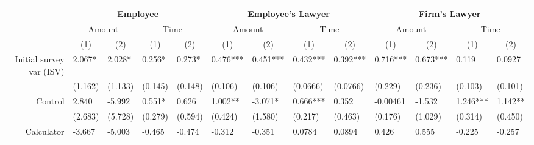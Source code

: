 \begin{tabular}{rrrrrrrrrrrrr}
\toprule
      & \multicolumn{4}{c}{Employee}  & \multicolumn{4}{c}{Employee's Lawyer} & \multicolumn{4}{c}{Firm's Lawyer} \\
\midrule
      & \multicolumn{2}{c}{Amount} & \multicolumn{2}{c}{Time} & \multicolumn{2}{c}{Amount} & \multicolumn{2}{c}{Time} & \multicolumn{2}{c}{Amount} & \multicolumn{2}{c}{Time} \\
      & \multicolumn{1}{c}{(1)} & \multicolumn{1}{c}{(2)} & \multicolumn{1}{c}{(1)} & \multicolumn{1}{c}{(2)} & \multicolumn{1}{c}{(1)} & \multicolumn{1}{c}{(2)} & \multicolumn{1}{c}{(1)} & \multicolumn{1}{c}{(2)} & \multicolumn{1}{c}{(1)} & \multicolumn{1}{c}{(2)} & \multicolumn{1}{c}{(1)} & \multicolumn{1}{c}{(2)} \\
Initial survey var (ISV) & \multicolumn{1}{l}{2.067*} & \multicolumn{1}{l}{2.028*} & \multicolumn{1}{l}{0.256*} & \multicolumn{1}{l}{0.273*} & \multicolumn{1}{l}{0.476***} & \multicolumn{1}{l}{0.451***} & \multicolumn{1}{l}{0.432***} & \multicolumn{1}{l}{0.392***} & \multicolumn{1}{l}{0.716***} & \multicolumn{1}{l}{0.673***} & \multicolumn{1}{l}{0.119} & \multicolumn{1}{l}{0.0927} \\
      & \multicolumn{1}{l}{(1.162)} & \multicolumn{1}{l}{(1.133)} & \multicolumn{1}{l}{(0.145)} & \multicolumn{1}{l}{(0.148)} & \multicolumn{1}{l}{(0.106)} & \multicolumn{1}{l}{(0.106)} & \multicolumn{1}{l}{(0.0666)} & \multicolumn{1}{l}{(0.0766)} & \multicolumn{1}{l}{(0.229)} & \multicolumn{1}{l}{(0.236)} & \multicolumn{1}{l}{(0.103)} & \multicolumn{1}{l}{(0.101)} \\
Control & \multicolumn{1}{l}{2.840} & \multicolumn{1}{l}{-5.992} & \multicolumn{1}{l}{0.551*} & \multicolumn{1}{l}{0.626} & \multicolumn{1}{l}{1.002**} & \multicolumn{1}{l}{-3.071*} & \multicolumn{1}{l}{0.666***} & \multicolumn{1}{l}{0.352} & \multicolumn{1}{l}{-0.00461} & \multicolumn{1}{l}{-1.532} & \multicolumn{1}{l}{1.246***} & \multicolumn{1}{l}{1.142**} \\
      & \multicolumn{1}{l}{(2.683)} & \multicolumn{1}{l}{(5.728)} & \multicolumn{1}{l}{(0.279)} & \multicolumn{1}{l}{(0.594)} & \multicolumn{1}{l}{(0.424)} & \multicolumn{1}{l}{(1.580)} & \multicolumn{1}{l}{(0.217)} & \multicolumn{1}{l}{(0.463)} & \multicolumn{1}{l}{(0.176)} & \multicolumn{1}{l}{(1.029)} & \multicolumn{1}{l}{(0.314)} & \multicolumn{1}{l}{(0.450)} \\
Calculator & \multicolumn{1}{l}{-3.667} & \multicolumn{1}{l}{-5.003} & \multicolumn{1}{l}{-0.465} & \multicolumn{1}{l}{-0.474} & \multicolumn{1}{l}{-0.312} & \multicolumn{1}{l}{-0.351} & \multicolumn{1}{l}{0.0784} & \multicolumn{1}{l}{0.0894} & \multicolumn{1}{l}{0.426} & \multicolumn{1}{l}{0.555} & \multicolumn{1}{l}{-0.225} & \multicolumn{1}{l}{-0.257} \\

\end{tabular}
